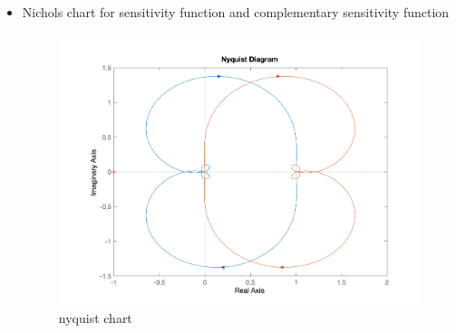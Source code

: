 \begin{itemize}
\begin{figure}[H]
    \end{figure}
    \item Nichols chart for sensitivity function and complementary sensitivity function 
    \begin{figure}[H]
        \caption{nyquist chart}
        \centering
        \includegraphics[width=12cm]{../Figure/Q1/Q1_d/nyquist.png}
    \end{figure}
\end{itemize}
